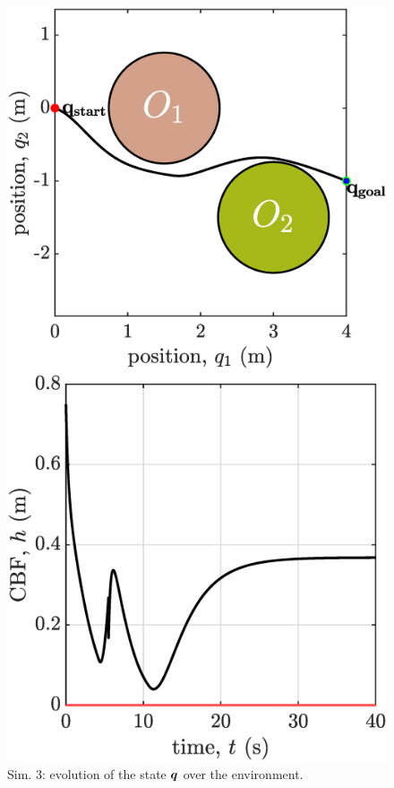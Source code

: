 \clearpage
\newpage
\begin{figure}[!ht]
    \begin{minipage}[b]{0.46\linewidth}
    \includegraphics[width=\textwidth]{figures/sim3map.eps}
    \caption{\label{fig:sim3map}Sim. 3: evolution of the state ${\boldsymbol{q}}$ over the environment.}
    \end{minipage}
    \hfill
    \begin{minipage}[b]{0.46\linewidth}
    \includegraphics[width=\textwidth]{figures/sim3h.eps}

\end{minipage}
\end{figure}
